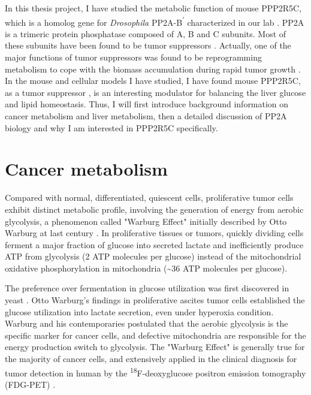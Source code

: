 In this thesis project, I have studied the metabolic function of mouse PPP2R5C, which is a homolog gene for \textit{Drosophila} PP2A-B\textsuperscript{$\prime$} characterized in our lab \cite{hahn_pp2a_2010}. PP2A is a trimeric protein phosphatase composed of A, B and C subunits. Most of these subunits have been found to be tumor suppressors \cite{seshacharyulu_phosphatase:_2013,janssens_pp2a:_2005,mumby_pp2a:_2007,eichhorn_protein_2009}. Actually, one of the major functions of tumor suppressors was found to be reprogramming metabolism to cope with the biomass accumulation during rapid tumor growth \cite{hanahan_hallmarks_2011,ward_metabolic_2012,cairns_regulation_2011}. In the mouse and cellular models I have studied, I have found mouse PPP2R5C, as a tumor suppressor \cite{li_specific_2007,nobumori_b56_2013,shouse_serine_2008}, is an interesting modulator for balancing the liver glucose and lipid homeostasis. Thus, I will first introduce background information on cancer metabolism and liver metabolism, then a detailed discussion of PP2A biology and why I am interested in PPP2R5C specifically.

\section{Cancer metabolism}

Compared with normal, differentiated, quiescent cells, proliferative tumor cells exhibit distinct metabolic profile, involving the generation of energy from aerobic glycolysis, a phenomenon called "Warburg Effect" initially described by Otto Warburg at last century \cite{warburg_respiratory_1956,warburg_origin_1956,warburg_metabolism_1931}. In proliferative tissues or tumors, quickly dividing cells ferment a major fraction of glucose into secreted lactate and inefficiently produce ATP from glycolysis (2 ATP molecules per glucose) instead of the mitochondrial oxidative phosphorylation in mitochondria (\textasciitilde36 ATP molecules per glucose). 

The preference over fermentation in glucose utilization was first discovered in yeast \cite{ward_metabolic_2012}. Otto Warburg's findings in proliferative ascites tumor cells established the glucose utilization into lactate secretion, even under hyperoxia condition. Warburg and his contemporaries postulated that the aerobic glycolysis is the specific marker for cancer cells, and defective mitochondria are responsible for the energy production switch to glycolysis. The "Warburg Effect" is generally true for the majority of cancer cells, and extensively applied in the clinical diagnosis for tumor detection in human by the \textsuperscript{18}F-deoxyglucose positron emission tomography (FDG-PET)  \cite{ward_metabolic_2012}.

